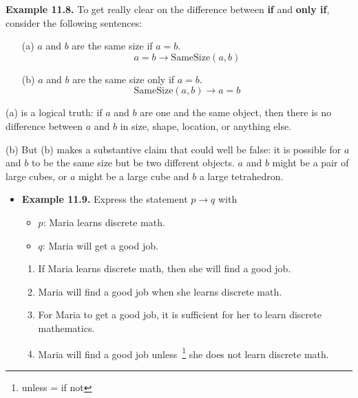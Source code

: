 \documentclass[aspectratio=169]{beamer}
\begin{document}
\begin{frame}[plain]{}

{\bf Example 11.8.}  To get really clear on the difference between {\bf if} and {\bf only if}, consider the following sentences:

\begin{itemize}
  \item[(a)] $a$ and $b$ are the same size if $a=b$.
      \[ a = b \rightarrow \mathrm{SameSize}(a, b) \]
  \item[(b)]  $a$ and $b$ are the same size only if $a=b$.
      \[ \mathrm{SameSize}(a, b) \rightarrow a = b \]
\end{itemize}  
\pause

(a) is a logical truth: if $a$ and $b$ are one and the same object, then there is no difference between $a$ and $b$ 
    in size, shape, location, or anything else.\pause
\smallskip

(b) But (b) makes a substantive claim that could well be false: it is possible for $a$ and $b$ to be the same size 
   but be two different objects. $a$ and $b$ might be a pair of large cubes, 
    or $a$ might be a large cube and $b$ a large tetrahedron.

\end{frame}


\begin{frame}[plain]{}

\begin{itemize}
    \item {\bf Example 11.9.} Express the statement $p\rightarrow q$ with
    \begin{itemize}
       \item $p$:  Maria learns discrete math.
       \item $q$:  Maria will get a good job.
    \end{itemize}
    \pause 
    
      \begin{enumerate}[<+->]
       \item If Maria learns discrete math, then she will find a good job. 
       \item Maria will find a good job when she learns discrete math.
       \item For Maria to get a good job, it is sufficient for her to learn discrete mathematics.
       \item Maria will find a good job unless~\footnote{unless = if not} 
             she does not learn discrete math.
      \end{enumerate}
      
    

    \end{itemize}
    
    \vspace{0.8in}
    
\end{frame}
\end{document}
